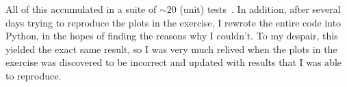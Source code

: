 \documentclass[11pt,twocolumn]{article}
\begin{document}
All of this accumulated in a suite of $\sim 20$ (unit)
tests~\cite[tests/]{github}. In addition, after several days trying to
reproduce the plots in the exercise, I rewrote the entire code into
Python, in the hopes of finding the reasons why I couldn't. To my
despair, this yielded the exact same result, so I was very much
relived when the plots in the exercise was discovered to be incorrect and updated
with results that I was able to reproduce. 



\printbibliography
\end{document}
